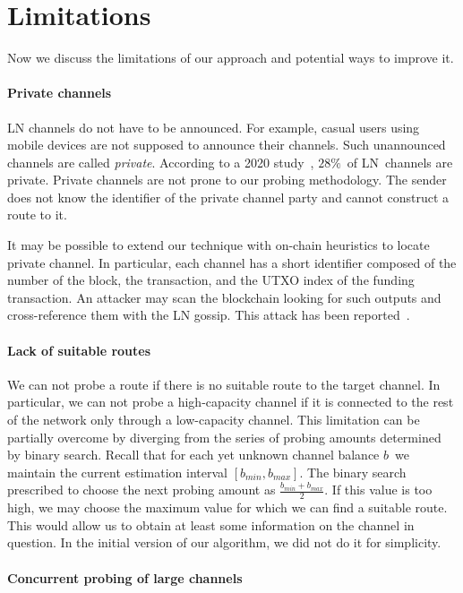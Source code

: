 \section{Limitations}

Now we discuss the limitations of our approach and potential ways to improve it.

\paragraph{Private channels}

LN channels do not have to be announced.
For example, casual users using mobile devices are not supposed to announce their channels.
Such unannounced channels are called \textit{private}.
According to a 2020 study~\cite{BitMEXPrivateChannels}, $28\%$~of LN~channels are private.
Private channels are not prone to our probing methodology.
The sender does not know the identifier of the private channel party and cannot construct a route to it.

It may be possible to extend our technique with on-chain heuristics to locate private channel.
In particular, each channel has a short identifier composed of the number of the block, the transaction, and the UTXO index of the funding transaction.
An attacker may scan the blockchain looking for such outputs and cross-reference them with the LN gossip.
This attack has been reported~\cite{Pickhardt2020}.

\paragraph{Lack of suitable routes}

We can not probe a route if there is no suitable route to the target channel.
In particular, we can not probe a high-capacity channel if it is connected to the rest of the network only through a low-capacity channel.
This limitation can be partially overcome by diverging from the series of probing amounts determined by binary search.
Recall that for each yet unknown channel balance $b$~we maintain the current estimation interval $[b_{min}, b_{max}]$.
The binary search prescribed to choose the next probing amount as $\frac{b_{min} + b_{max}}{2}$.
If this value is too high, we may choose the maximum value for which we can find a suitable route.
This would allow us to obtain at least some information on the channel in question.
In the initial version of our algorithm, we did not do it for simplicity.

\paragraph{Concurrent probing of large channels}

